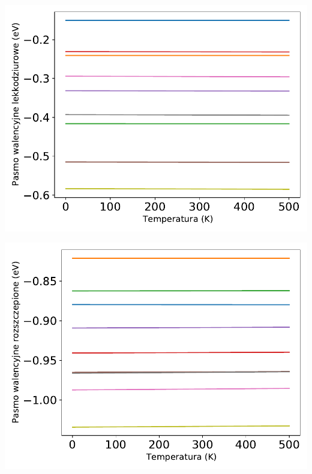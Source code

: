 \documentclass[12pt,openany,a4paper]{book}
\begin{document}
\begin{minipage}[t]{0.5\textwidth}
	\includegraphics[width = \linewidth]{Figures/strain/Ev_lh2.pdf}\label{fig:Ev_lh2}
\end{minipage}
\begin{minipage}[t]{0.5\textwidth}
	\includegraphics[width = \linewidth]{Figures/strain/Ev_sh2.pdf}\label{fig:Ev_sh2}
\end{minipage}
\begin{center}
\label{fig:bands2}
\end{center}
\end{document}
